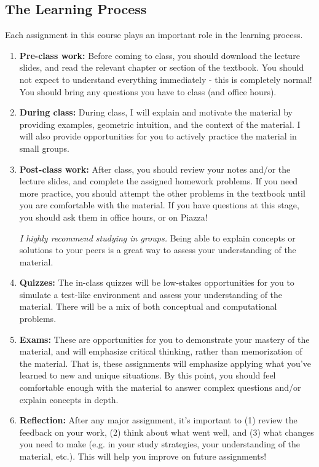 \documentclass[11pt]{article}
\begin{document}
\subsection{The Learning Process}

Each assignment in this course plays an important role in the learning process.  
\begin{enumerate}
\item \textbf{Pre-class work:} Before coming to class, you should download the lecture slides, and read the relevant chapter or section of the textbook.  You should not expect to understand everything immediately - this is completely normal!  You should bring any questions you have to class (and office hours).

\item \textbf{During class:}  During class, I will explain and motivate the material by providing examples, geometric intuition, and the context of the material.  I will also provide opportunities for you to actively practice the material in small groups.

\item \textbf{Post-class work:} After class, you should review your notes and/or the lecture slides, and complete the assigned homework problems.  If you need more practice, you should attempt the other problems in the textbook until you are comfortable with the material. If you have questions at this stage, you should ask them in office hours, or on Piazza!  

\emph{I highly recommend studying in groups.} Being able to explain concepts or solutions to your peers is a great way to assess your understanding of the material.


\item \textbf{Quizzes:}  The in-class quizzes will be low-stakes opportunities for you to simulate a test-like environment and assess your understanding of the material.   There will be a mix of both conceptual and computational problems.

\item \textbf{Exams:}  These are opportunities for you to demonstrate your mastery of the material, and will emphasize critical thinking, rather than memorization of the material.  That is, these assignments will emphasize applying what you've learned to new and unique situations. By this point, you should feel comfortable enough with the material to answer complex questions and/or explain concepts in depth.

\item \textbf{Reflection:}  After any major assignment, it's important to (1) review the feedback on your work, (2) think about what went well, and (3) what changes you need to make (e.g. in your study strategies, your understanding of the material, etc.).  This will help you improve on future assignments!

\end{enumerate}
\end{document}
